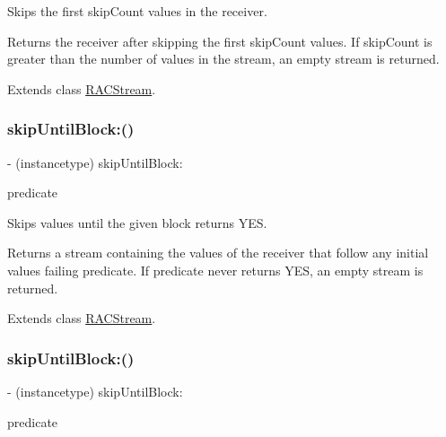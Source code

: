Skips the first {\ttfamily skip\+Count} values in the receiver.

Returns the receiver after skipping the first {\ttfamily skip\+Count} values. If {\ttfamily skip\+Count} is greater than the number of values in the stream, an empty stream is returned. 

Extends class \mbox{\hyperlink{interface_r_a_c_stream_a1525f1607d8ff7f04a0afc1a5193436a}{R\+A\+C\+Stream}}.

\mbox{\label{category_r_a_c_stream_07_operations_08_a008935d03ebc55b40b461dc080cddd38}} 
\subsubsection{\texorpdfstring{skip\+Until\+Block\+:()}{skipUntilBlock:()}\hspace{0.1cm}{\footnotesize\ttfamily [1/3]}}
{\footnotesize\ttfamily -\/ (instancetype) skip\+Until\+Block\+: \begin{DoxyParamCaption}\item[{(B\+O\+OL($^\wedge$)(id x))}]{predicate }\end{DoxyParamCaption}}

Skips values until the given block returns {\ttfamily Y\+ES}.

Returns a stream containing the values of the receiver that follow any initial values failing {\ttfamily predicate}. If {\ttfamily predicate} never returns {\ttfamily Y\+ES}, an empty stream is returned. 

Extends class \mbox{\hyperlink{interface_r_a_c_stream_a008935d03ebc55b40b461dc080cddd38}{R\+A\+C\+Stream}}.

\mbox{\label{category_r_a_c_stream_07_operations_08_a008935d03ebc55b40b461dc080cddd38}} 
\subsubsection{\texorpdfstring{skip\+Until\+Block\+:()}{skipUntilBlock:()}\hspace{0.1cm}{\footnotesize\ttfamily [2/3]}}
{\footnotesize\ttfamily -\/ (instancetype) skip\+Until\+Block\+: \begin{DoxyParamCaption}\item[{(B\+O\+OL($^\wedge$)(id x))}]{predicate }\end{DoxyParamCaption}}

